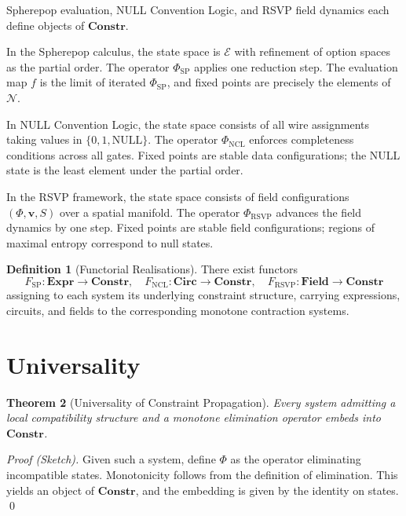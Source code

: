 \documentclass[12pt, oneside]{amsbook}
\theoremstyle{plain}
\newtheorem{theorem}{Theorem}[section]
\theoremstyle{definition}
\newtheorem{definition}[theorem]{Definition}
\theoremstyle{remark}
\newcommand{\Expr}{\mathcal{E}}
\newcommand{\NF}{\mathcal{N}}
\newcommand{\evalf}{f}
\newcommand{\RSVPfield}{\Phi}
\newcommand{\RSVPvec}{\mathbf{v}}
\begin{document}
Spherepop evaluation, NULL Convention Logic, and RSVP field dynamics each
define objects of $\mathbf{Constr}$.

In the Spherepop calculus, the state space is $\Expr$ with refinement of
option spaces as the partial order. The operator $\Phi_{\mathrm{SP}}$ applies
one reduction step. The evaluation map $\evalf$ is the limit of iterated
$\Phi_{\mathrm{SP}}$, and fixed points are precisely the elements of $\NF$.

In NULL Convention Logic, the state space consists of all wire assignments
taking values in $\{0, 1, \mathrm{NULL}\}$. The operator
$\Phi_{\mathrm{NCL}}$ enforces completeness conditions across all gates. Fixed
points are stable data configurations; the NULL state is the least element
under the partial order.

In the RSVP framework, the state space consists of field configurations
$(\RSVPfield, \RSVPvec, S)$ over a spatial manifold. The operator
$\Phi_{\mathrm{RSVP}}$ advances the field dynamics by one step. Fixed points
are stable field configurations; regions of maximal entropy correspond to null
states.

\begin{definition}[Functorial Realisations]
There exist functors
\[
  F_{\mathrm{SP}} : \mathbf{Expr} \to \mathbf{Constr}, \quad
  F_{\mathrm{NCL}} : \mathbf{Circ} \to \mathbf{Constr}, \quad
  F_{\mathrm{RSVP}} : \mathbf{Field} \to \mathbf{Constr}
\]
assigning to each system its underlying constraint structure, carrying
expressions, circuits, and fields to the corresponding monotone contraction
systems.
\end{definition}

\section{Universality}
\label{sec:constr:universal}

\begin{theorem}[Universality of Constraint Propagation]
\label{thm:universality}
Every system admitting a local compatibility structure and a monotone
elimination operator embeds into $\mathbf{Constr}$.
\end{theorem}

\begin{proof}[Proof (Sketch)]
Given such a system, define $\Phi$ as the operator eliminating incompatible
states. Monotonicity follows from the definition of elimination. This yields an
object of $\mathbf{Constr}$, and the embedding is given by the identity on
states. \qed
\end{proof}
\end{document}
